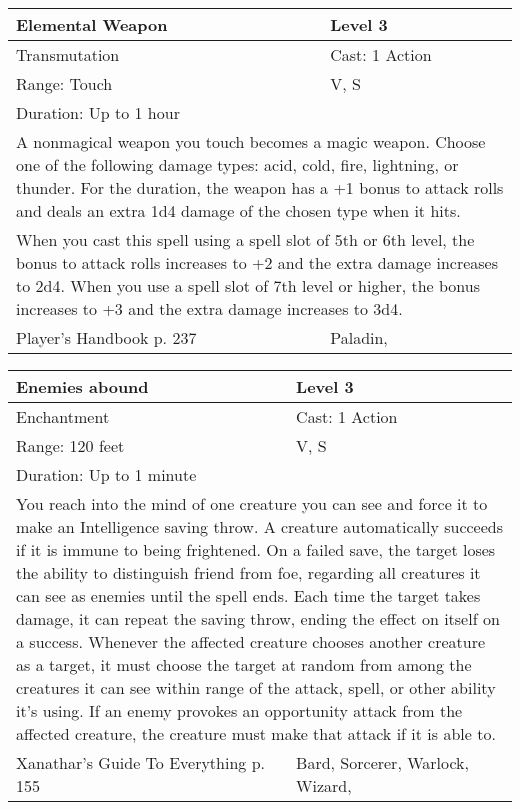 \documentclass[11pt]{report}
\begin{document}
\begin{table}[H]
	\begin{tabular}{||p{6cm}|p{6cm}||}
		\hline\hline
		\bf{Elemental Weapon} & Level 3\\ \hline
		Transmutation & Cast: 1 Action\\ \hline
		Range: Touch & V, S\\ \hline
		Duration: Up to 1 hour & \\ \hline
		\multicolumn{2}{||p{12cm}||}{A nonmagical weapon you touch becomes a magic weapon. 
Choose one of the following damage types: acid, cold, fire, lightning, or thunder. For the duration, the weapon has a +1 bonus to attack rolls and deals an extra 1d4 damage of the chosen type when it hits.}\\ \hline
		\multicolumn{2}{||p{12cm}||}{When you cast this spell using a spell slot of 5th or 6th level, the bonus to attack rolls increases to +2 and the extra damage increases to 2d4. 
When you use a spell slot of 7th level or higher, the bonus increases to +3 and the extra damage increases to 3d4.}\\ \hline
Player's Handbook p. 237 & Paladin, \\ \hline\hline
	\end{tabular}
\end{table}

\begin{table}[H]
	\begin{tabular}{||p{6cm}|p{6cm}||}
		\hline\hline
		\bf{Enemies abound} & Level 3\\ \hline
		Enchantment & Cast: 1 Action\\ \hline
		Range: 120 feet & V, S\\ \hline
		Duration: Up to 1 minute & \\ \hline
		\multicolumn{2}{||p{12cm}||}{You reach into the mind of one creature you can see and force it to make an Intelligence saving throw. A creature automatically succeeds if it is immune to being frightened. On a failed save, the target loses the ability to distinguish friend from foe, regarding all creatures it can see as enemies until the spell ends. Each time the target takes damage, it can repeat the saving throw, ending the effect on itself on a success. Whenever the affected creature chooses another creature as a target, it must choose the target at random from among the creatures it can see within range of the attack, spell, or other ability it’s using. If an enemy provokes an opportunity attack from the affected creature, the creature must make that attack if it is able to.}\\ \hline
Xanathar's Guide To Everything p. 155 & Bard, Sorcerer, Warlock, Wizard, \\ \hline\hline
	\end{tabular}
\end{table}
\end{document}
